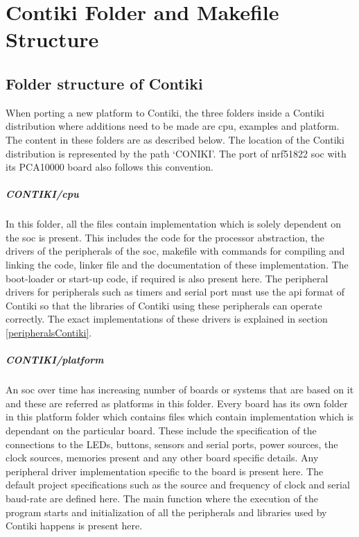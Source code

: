 \chapter{Contiki Folder and Makefile Structure} \label{ApdxContiki}

\section{Folder structure of Contiki} \label{ApdxFolder}
When porting a new platform to Contiki, the three folders inside a Contiki distribution where additions need to be made are cpu, examples and platform. The content in these folders are as described below. The location of the Contiki distribution is represented by the path `CONIKI'. The port of nrf51822 \gls{soc} with its PCA10000 board also follows this convention.

\paragraph{CONTIKI/cpu}In this folder, all the files contain implementation which is solely dependent on the \gls{soc} is present. This includes the code for the processor abstraction, the drivers of the peripherals of the \gls{soc}, makefile with commands for compiling and linking the code, linker file and the documentation of these implementation. The boot-loader  or start-up code, if required is also present here. The peripheral drivers for peripherals such as timers and serial port must use the \gls{api} format of Contiki so that the libraries of Contiki using these peripherals can operate correctly. The exact implementations of these drivers is explained in section \ref{peripheralsContiki}. 

\paragraph{CONTIKI/platform} An \gls{soc} over time has increasing number of boards or systems that are based on it and these are referred as platforms in this folder. Every board has its own folder in this platform folder which contains files which contain implementation which is dependant on the particular board. These include the specification of the connections to the LEDs, buttons, sensors and serial ports, power sources, the clock sources, memories present and any other board specific details. Any peripheral driver implementation specific to the board is present here. The default project specifications such as the source and frequency of clock and serial baud-rate are defined here. The main function where the execution of the program starts and initialization of all the peripherals and libraries used by Contiki happens is present here.

